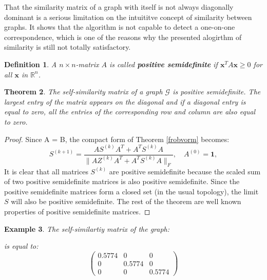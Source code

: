 \documentclass[a4paper,11pt]{report}
\newtheorem{theorem}{Theorem}[section]
\newtheorem{example}[theorem]{Example}
\newtheorem{definition}[theorem]{Definition}
\newcommand{\R}{{\mathbb R}}
\newcommand{\graf}{\mathscr{G}}
\begin{document}
That the similarity matrix of a graph with itself is not always diagonally dominant is a serious limitation
on the intuititve concept of similarity between graphs. It shows that the 
algorithm is not capable to detect a one-on-one correspondence, which is one of 
the reasons why the presented alogirthm of similarity is still not totally 
satisfactory.
\begin{definition}
  A $n\times n$-matrix $A$ is called \textbf{positive semidefinite} if
$\mathbf{x}^{T} A \mathbf{x}\geq 0$
for all $\mathbf{x}$ in $\R^n$.
\end{definition}
\begin{theorem}
  The self-similarity matrix of a graph $\graf$ is positive semidefinite. The largest entry of the matrix appears on the 
diagonal and if a diagonal entry is equal to zero,  all the entries of the corresponding row and 
column are also equal to zero.
\end{theorem}
\begin{proof}
  Since A = B, the compact form of Theorem \ref{frobvorm} becomes:
 $$S^{(k+1)} = \frac{AS^{(k)}A^T + A^TS^{(k)}A}{\|AZ^{(k)}A^T + A^TS^{(k)}A\|_F}, \quad A^{(0)} = \mathbf{1},  $$
  It is clear that all matrices $S^{(k)}$ are positive semidefinite because the 
  scaled sum of two positive semidefinite matrices is also positive 
  semidefinite. Since the positive semidefinite matrices form a closed set (in the usual 
  topology), the limit $S$ will also be positive semidefinite. The rest of the 
  theorem are well known properties of positive semidefinite matrices.
\end{proof}
\begin{example}
  The self-similartiy matrix of the graph:
  \begin{center}
\end{center}
is equal to:
$$\begin{pmatrix}
  0.5774 & 0 & 0 \\
  0 & 0.5774 & 0 \\
  0 & 0 & 0.5774
\end{pmatrix}$$
\end{example}
\end{document}
